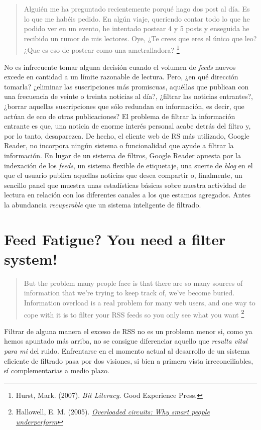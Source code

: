 \documentclass[12pt, a4paper,twoside]{book}
\begin{document}
\begin{quote}
Alguién me ha preguntado recientemente porqué hago dos post al día.
Es lo que me habéis pedido. En algún viaje, queriendo contar todo
lo que he podido ver en un evento, he intentado postear 4 y 5 posts
y enseguida he recibido un rumor de mis lectores. Oye, ¿Te crees
que eres el único que leo? ¿Que es eso de postear como una
ametralladora?%
\footnote{Hurst, Mark. (2007). \emph{Bit Literacy}. Good Experience Press.}

\end{quote}
No es infrecuente tomar alguna decisión cuando el volumen de
\emph{feeds} nuevos excede en cantidad a un límite razonable de
lectura. Pero, ¿en qué dirección tomarla? ¿eliminar las
suscripciones más promiscuas, aquéllas que publican con una
frecuencia de veinte o treinta noticias al día?, ¿filtrar las
noticias entrantes?, ¿borrar aquellas suscripciones que sólo
redundan en información, es decir, que actúan de eco de otras
publicaciones? El problema de filtrar la información entrante es
que, una noticia de enorme interés personal acabe detrás del filtro
y, por lo tanto, desaparezca. De hecho, el cliente web de RS más
utilizado, Google Reader, no incorpora ningún sistema o
funcionalidad que ayude a filtrar la información. En lugar de un
sistema de filtros, Google Reader apuesta por la indexación de los
\emph{feeds}, un sistema flexible de etiquetaje, una suerte de
\emph{blog} en el que el usuario publica aquellas noticias que
desea compartir o, finalmente, un sencillo panel que muestra unas
estadísticas básicas sobre nuestra actividad de lectura en relación
con los diferentes canales a los que estamos agregados. Antes la
abundancia \emph{recuperable} que un sistema inteligente de
filtrado.

\section{Feed Fatigue? You need a filter system!}

\begin{quote}
But the problem many people face is that there are so many sources
of information that we're trying to keep track of, we've become
buried. Information overload is a real problem for many web users,
and one way to cope with it is to filter your RSS feeds so you only
see what you want%
\footnote{Hallowell, E. M. (2005).
\emph{\href{http://tr.im/wSsS}{Overloaded circuits: Why smart people underperform}}}

\end{quote}
Filtrar de alguna manera el exceso de RSS no es un problema menor
si, como ya hemos apuntado más arriba, no se consigue diferenciar
aquello que \emph{resulta vital para mi} del ruido. Enfrentarse en
el momento actual al desarrollo de un sistema eficiente de filtrado
pasa por dos visiones, si bien a primera vista irreconciliables, sí
complementarias a medio plazo.
\end{document}

